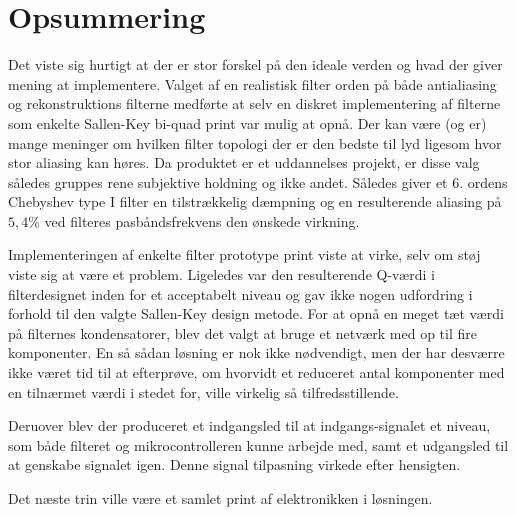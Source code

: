 \section{Opsummering}

Det viste sig hurtigt at der er stor forskel på den ideale verden og hvad der giver mening at implementere.
Valget af en realistisk filter orden på både antialiasing og rekonstruktions filterne medførte at selv en diskret implementering af filterne som enkelte Sallen-Key bi-quad print var mulig at opnå.
Der kan være (og er) mange meninger om hvilken filter topologi der er den bedste til lyd ligesom hvor stor aliasing kan høres.
Da produktet er et uddannelses projekt, er disse valg således gruppes rene subjektive holdning og ikke andet.
Således giver et 6. ordens Chebyshev type I filter en tilstrækkelig dæmpning og en resulterende aliasing på  $5,4\si\percent$ ved filteres pasbåndsfrekvens den ønskede virkning. 

Implementeringen af enkelte filter prototype print viste at virke, selv om støj viste sig at være et problem.
Ligeledes var den resulterende Q-værdi i filterdesignet inden for et acceptabelt niveau og gav ikke nogen udfordring i forhold til den valgte Sallen-Key design metode. 
For at opnå en meget tæt værdi på filternes kondensatorer, blev det valgt at bruge et netværk med op til fire komponenter.
En så sådan løsning er nok ikke nødvendigt, men der har desværre ikke været tid til at efterprøve, om hvorvidt et reduceret antal komponenter med en tilnærmet værdi i stedet for, ville virkelig så tilfredsstillende.

Deruover blev der produceret et indgangsled til at indgangs-signalet et niveau, som både filteret og mikrocontrolleren kunne arbejde med, samt et udgangsled til at genskabe signalet igen.
Denne signal tilpasning virkede efter hensigten.

Det næste trin ville være et samlet print af elektronikken i løsningen.
